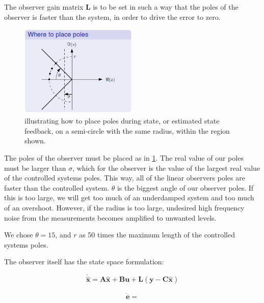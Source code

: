 The observer gain matrix $\bm{L}$ is to be set in such a way that the poles of the observer is faster than the system, in order to drive the error to zero.
	\begin{figure}[H]
		\caption{ illustrating how to place poles during state, or estimated state feedback, on a semi-circle with the same radius, within the region shown.}
		\label{fig:pole_placement}
		\begin{center}
		\includegraphics[width=0.5\textwidth]{images/pole_placement}
		\end{center}
	\end{figure}
The poles of the observer must be placed as in \cref{fig:pole_placement}. The real value of our poles must be larger than $\sigma$, which for the observer is the value of the largest real value of the controlled systems poles. This way, all of the linear observers poles are faster than the controlled system. $\theta$ is the biggest angle of our observer poles. If this is too large, we will get too much of an underdamped system and too much of an overshoot. However, if the radius is too large, undesired high frequency noise from the measurements becomes amplified to unwanted levels.

We chose $\theta = 15$, and $r$ as 50 times the maximum length of the controlled systems poles.

The observer itself has the state space formulation:

\begin{equation*}
	\dot{\hat{\bm{x}}} = \bm{A}\hat{\bm{x}}+\bm{B}\bm{u} + \bm{L}(\bm{y} - \bm{C}\hat{\bm{x}})
\end{equation*}

\begin{align*}
	\bm{\dot{e}} =
\end{align*}
